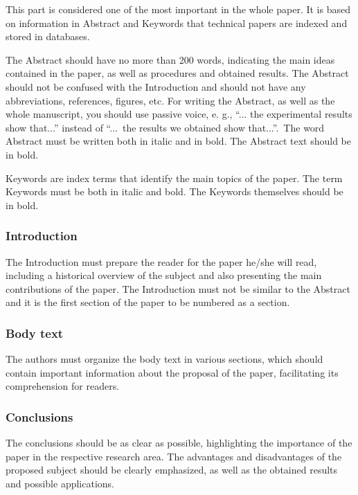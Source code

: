 \documentclass[english]{cobep-spec}
\begin{document}
This part is considered one of the most important in the whole paper. It is based on information in Abstract and Keywords that technical papers are indexed and stored in databases. 

The Abstract should have no more than 200 words, indicating the main ideas contained in the paper, as well as procedures and obtained results. The Abstract should not be confused with the Introduction and should not have any abbreviations, references, figures, etc. For writing the Abstract, as well as the whole manuscript, you should use passive voice, e. g.,  ``... the experimental results show that...'' instead of ``...~the results we obtained show that...''.~The word Abstract must be written both in italic and in bold. The Abstract text should be in bold.

Keywords are index terms that identify the main topics of the paper. The term Keywords must be both in italic and bold. The Keywords themselves should be in bold.

\subsubsection{Introduction}

The Introduction must prepare the reader for the paper he/she will read, including a historical overview of the subject and also presenting the main contributions of the paper. The Introduction must not be similar to the Abstract and it is the first section of the paper to be numbered as a section.

\subsubsection{Body text}

The authors must organize the body text in various sections, which should contain important information about the proposal of the paper, facilitating its comprehension for readers.

\subsubsection{Conclusions}

The conclusions should be as clear as possible, highlighting the importance of the paper in the respective research area. The advantages and disadvantages of the proposed subject should be clearly emphasized, as well as the obtained results and possible applications.
\end{document}
